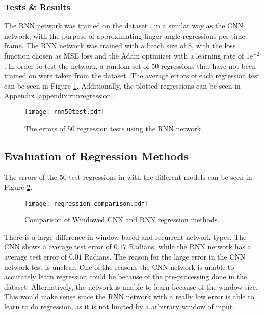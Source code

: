 \documentclass[../main.tex]{subfiles}
\begin{document}
\subsubsection{Tests \& Results}

The RNN network was trained on the dataset \cite{kinmusdataset}, in a similar way as the CNN network, with the purpose of approximating finger angle regressions per time frame.
The RNN network was trained with a batch size of 8, with the loss function chosen as MSE loss and the Adam optimizer with a learning rate of $1\text{e}^{-2}$.
In order to test the network, a random set of 50 regressions that have not been trained on were taken from the dataset.
The average errors of each regression test can be seen in Figure \ref{fig:rnntest}.
Additionally, the plotted regressions can be seen in Appendix \ref{appendix:rnnregression}.

\begin{figure}[H]
\begin{center}
\texttt{[image: rnn50test.pdf]}
\caption{The errors of 50 regression tests using the RNN network.}
\label{fig:rnntest}
\end{center}
\end{figure}

\newpage
\subsection{Evaluation of Regression Methods}

The errors of the 50 test regressions in with the different models can be seen in Figure \ref{fig:regression_comp}.

\begin{figure}[h]
\begin{center}
\texttt{[image: regression\_comparison.pdf]}
\caption{Comparison of Windowed CNN and RNN regression methods.}
\label{fig:regression_comp}
\end{center}
\end{figure}

There is a large difference in window-based and recurrent network types.
The CNN shows a average test error of $0.17$ Radians, while the RNN network has a average test error of $0.01$ Radians. 
The reason for the large error in the CNN network test is unclear.
One of the reasons the CNN network is unable to accurately learn regression could be because of the pre-processing done in the dataset.
Alternatively, the network is unable to learn because of the window size. This would make sense since the RNN network with a really low error is able to learn to do regression, as it is not limited by a arbitrary window of input.
\end{document}
